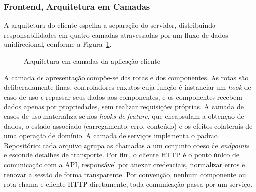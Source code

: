 \subsubsection{Frontend, Arquitetura em Camadas}

A arquitetura do cliente espelha a separação do servidor, distribuindo responsabilidades em quatro camadas atravessadas por um fluxo de dados unidirecional, conforme a Figura~\ref{fig:fe_arquitetura}.

\begin{figure}[H]
\centering
\setlength{\fboxsep}{8pt}
\caption{Arquitetura em camadas da aplicação cliente}
\label{fig:fe_arquitetura}
\end{figure}

A camada de apresentação compõe-se das rotas e dos componentes. As rotas são deliberadamente finas, controladores enxutos cuja função é instanciar um \textit{hook} de caso de uso e repassar seus dados aos componentes, e os componentes recebem dados apenas por propriedades, sem realizar requisições próprias. A camada de casos de uso materializa-se nos \textit{hooks de feature}, que encapsulam a obtenção de dados, o estado associado (carregamento, erro, conteúdo) e os efeitos colaterais de uma operação de domínio. A camada de serviços implementa o padrão Repositório: cada arquivo agrupa as chamadas a um conjunto coeso de \textit{endpoints} e esconde detalhes de transporte. Por fim, o cliente HTTP é o ponto único de comunicação com a API, responsável por anexar credenciais, normalizar erros e renovar a sessão de forma transparente. Por convenção, nenhum componente ou rota chama o cliente HTTP diretamente, toda comunicação passa por um serviço.

